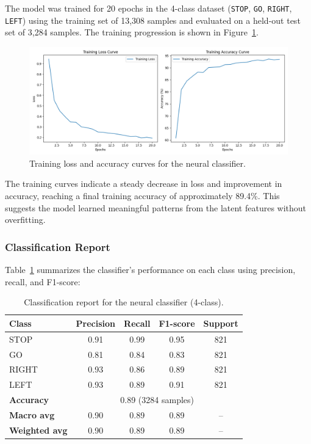 The model was trained for 20 epochs in the 4-class dataset (\texttt{STOP}, \texttt{GO}, \texttt{RIGHT}, \texttt{LEFT}) using the training set of 13,308 samples and evaluated on a held-out test set of 3,284 samples. The training progression is shown in Figure~\ref{fig:loss_accuracy_plot}.

\begin{figure}[h]
    \centering
    \includegraphics[width=\textwidth]{img/classifier/training_loss_accuracy_4_classes.png}
    \caption{Training loss and accuracy curves for the neural classifier.}
    \label{fig:loss_accuracy_plot}
\end{figure}

The training curves indicate a steady decrease in loss and improvement in accuracy, reaching a final training accuracy of approximately 89.4\%. This suggests the model learned meaningful patterns from the latent features without overfitting.

\subsubsection*{Classification Report}

Table~\ref{tab:classification_report} summarizes the classifier's performance on each class using precision, recall, and F1-score:

\begin{table}[h]
\centering
\begin{tabular}{lcccc}
\toprule
\textbf{Class} & \textbf{Precision} & \textbf{Recall} & \textbf{F1-score} & \textbf{Support} \\
\midrule
STOP  & 0.91 & 0.99 & 0.95 & 821 \\
GO    & 0.81 & 0.84 & 0.83 & 821 \\
RIGHT & 0.93 & 0.86 & 0.89 & 821 \\
LEFT  & 0.93 & 0.89 & 0.91 & 821 \\
\midrule
\textbf{Accuracy} & \multicolumn{4}{c}{0.89 (3284 samples)} \\
\textbf{Macro avg} & 0.90 & 0.89 & 0.89 & -- \\
\textbf{Weighted avg} & 0.90 & 0.89 & 0.89 & -- \\
\bottomrule
\end{tabular}
\caption{Classification report for the neural classifier (4-class).}
\label{tab:classification_report}
\end{table}

